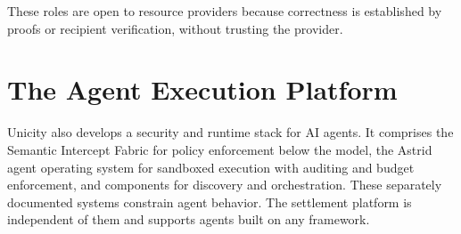 These roles are open to resource providers because correctness is established by proofs or recipient verification, without trusting the provider.

\section{The Agent Execution Platform}

Unicity also develops a security and runtime stack for AI agents. It comprises the Semantic Intercept Fabric for policy enforcement below the model, the Astrid agent operating system for sandboxed execution with auditing and budget enforcement, and components for discovery and orchestration. These separately documented systems constrain agent behavior. The settlement platform is independent of them and supports agents built on any framework.
